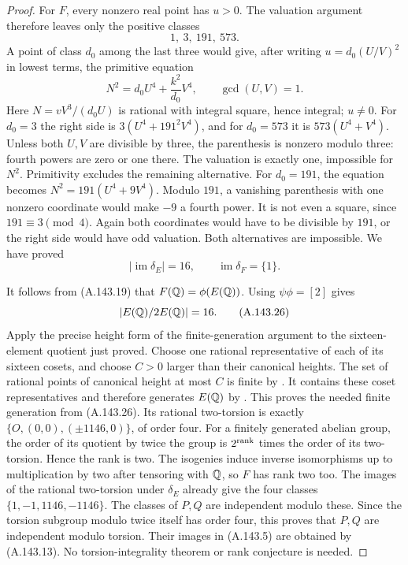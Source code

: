 \begin{proof}
For \(F\), every nonzero real point has \(u>0\).
The valuation argument therefore leaves only the positive classes
\[
                                  1,\ 3,\ 191,\ 573 .
\tag{A.143.23}
\]
A point of class \(d_0\) among the last three would give, after
writing \(u=d_0(U/V)^2\) in lowest terms, the primitive equation
\[
                 N^2=d_0U^4+\frac{k^2}{d_0}V^4,
                      \qquad \gcd(U,V)=1 .
\tag{A.143.24}
\]
Here \(N=vV^3/(d_0U)\) is rational with integral square, hence
integral; \(u\ne0\).
For \(d_0=3\) the right side is
\(3(U^4+191^2V^4)\), and for \(d_0=573\) it is
\(573(U^4+V^4)\).
Unless both \(U,V\) are divisible by three, the parenthesis is
nonzero modulo three: fourth powers are zero or one there.
The valuation is exactly one, impossible for \(N^2\).
Primitivity excludes the remaining alternative.
For \(d_0=191\), the equation becomes
\(N^2=191(U^4+9V^4)\).
Modulo \(191\), a vanishing parenthesis with one nonzero
coordinate would make \(-9\) a fourth power.  It is not even
a square, since \(191\equiv3\pmod4\).
Again both coordinates would have to be divisible by \(191\),
or the right side would have odd valuation.  Both alternatives
are impossible.
We have proved
\[
                 |\operatorname{im}\delta_E|=16,\qquad
                 \operatorname{im}\delta_F=\{1\}.
\tag{A.143.25}
\]

It follows from (A.143.19) that \(F(\mathbb Q)=\phi(E(\mathbb Q))\).
Using \(\psi\phi=[2]\) gives
\[
                        |E(\mathbb Q)/2E(\mathbb Q)|=16.
\tag{A.143.26}
\]
Apply the precise height form of the finite-generation argument
to the sixteen-element quotient just proved.
Choose one rational representative of each of its sixteen
cosets, and choose \(C>0\) larger than their canonical heights.
The set of rational points of canonical height at most \(C\)
is finite by \cite[IV, Theorem 4.7(a)]{AgentMilneEC}.
It contains these coset representatives and therefore generates
\(E(\mathbb Q)\) by \cite[IV, Proposition 4.13]{AgentMilneEC}.
This proves the needed finite generation from (A.143.26).
Its rational two-torsion is exactly
\(\{O,(0,0),(\pm1146,0)\}\), of order four.
For a finitely generated abelian group, the order of its quotient
by twice the group is \(2^{\rm rank}\) times the order of its
two-torsion.  Hence the rank is two.
The isogenies induce inverse isomorphisms up to multiplication
by two after tensoring with \(\mathbb Q\), so \(F\) has rank two too.
The images of the rational two-torsion under \(\delta_E\)
already give the four classes \(\{1,-1,1146,-1146\}\).
The classes of \(P,Q\) are independent modulo these.
Since the torsion subgroup modulo twice itself has order four,
this proves that \(P,Q\) are independent modulo torsion.
Their images in (A.143.5) are obtained by (A.143.13).
No torsion-integrality theorem or rank conjecture is needed.


\end{proof}
